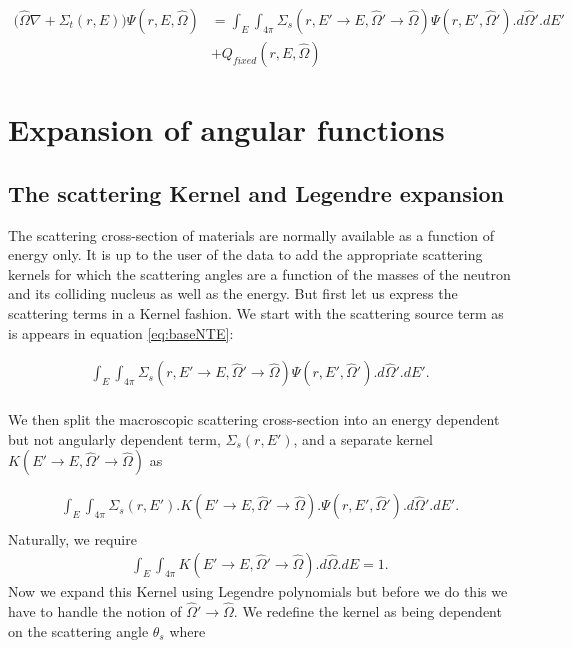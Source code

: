 \documentclass[11pt,letterpaper,titlepage]{article}
\numberwithin{equation}{section}
\begin{document}
\begin{equation} \label{eq:baseNTE}
\begin{aligned}
\biggr(\hat{\Omega}\nabla +\Sigma_t (r,E)\biggr) \Psi(r,E,\hat{\Omega})
&=  \int_E \int_{4\pi}
\Sigma_s (r,E'{\to} E,\hat{\Omega}' {\to} \hat{\Omega}) \Psi (r,E',\hat{\Omega}') 
.d\hat{\Omega}'.dE'\\
&+ Q_{fixed}(r,E,\hat{\Omega})
\end{aligned}
\end{equation}

\newpage
{}
\section{Expansion of angular functions}
\subsection{The scattering Kernel and Legendre expansion}
The scattering cross-section of materials are normally available as a function of energy only. It is up to the user of the data to add the appropriate scattering kernels for which the scattering angles are a function of the masses of the neutron and its colliding nucleus as well as the energy. But first let us express the scattering terms in a Kernel fashion. We start with the scattering source term as is appears in equation \ref{eq:baseNTE}:

\begin{align*}
\int_E \int_{4\pi}
\Sigma_s (r,E'{\to} E,\hat{\Omega}' {\to} \hat{\Omega}) \Psi (r,E',\hat{\Omega}') 
.d\hat{\Omega}'.dE'.\\
\end{align*}

We then split the macroscopic scattering cross-section into an energy dependent but not angularly dependent term, $\Sigma_s (r,E')$, and a separate kernel $K(E'{\to}E,\hat{\Omega}'{\to}\hat{\Omega})$ as 

\begin{align*}
\int_E \int_{4\pi}
\Sigma_s (r,E').K(E'{\to}E,\hat{\Omega}'{\to}\hat{\Omega}).\Psi (r,E',\hat{\Omega}') 
.d\hat{\Omega}'.dE'.\\
\end{align*}
\newline
Naturally, we require 
\begin{align} \label{eq:kernelIntegralUnity}
\int_E\int_{4\pi}
K(E'{\to}E,\hat{\Omega}'{\to}\hat{\Omega}) 
.d\hat{\Omega}.dE=1.
\end{align}
\newline
Now we expand this Kernel using Legendre polynomials but before we do this we have to handle the notion of $\hat{\Omega}'{\to}\hat{\Omega}$. We redefine the kernel as being dependent on the scattering angle $\theta_s$ where
\end{document}
